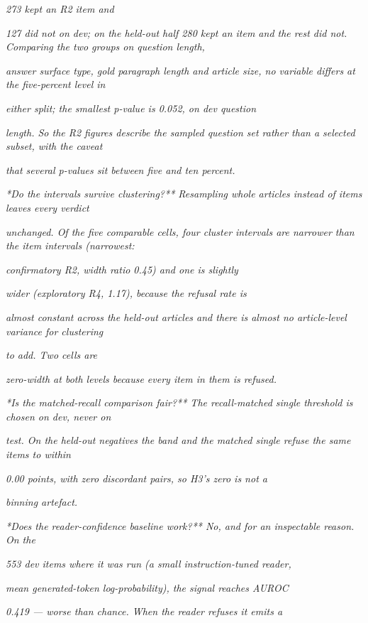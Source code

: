 \textit{273 kept an R2 item and}

\textit{127 did not on dev; on the held-out half 280 kept an item and the rest did not. Comparing the two groups on question length,}

\textit{answer surface type, gold paragraph length and article size, no variable differs at the five-percent level in}

\textit{either split; the smallest p-value is 0.052, on dev question}

\textit{length. So the R2 figures describe the sampled question set rather than a selected subset, with the caveat}

\textit{that several p-values sit between five and ten percent.}

\textit{*Do the intervals survive clustering?** Resampling whole articles instead of items leaves every verdict}

\textit{unchanged. Of the five comparable cells, four cluster intervals are narrower than the item intervals (narrowest:}

\textit{confirmatory R2, width ratio 0.45) and one is slightly}

\textit{wider (exploratory R4, 1.17), because the refusal rate is}

\textit{almost constant across the held-out articles and there is almost no article-level variance for clustering}

\textit{to add. Two cells are}

\textit{zero-width at both levels because every item in them is refused.}

\textit{*Is the matched-recall comparison fair?** The recall-matched single threshold is chosen on dev, never on}

\textit{test. On the held-out negatives the band and the matched single refuse the same items to within}

\textit{0.00 points, with zero discordant pairs, so H3's zero is not a}

\textit{binning artefact.}

\textit{*Does the reader-confidence baseline work?** No, and for an inspectable reason. On the}

\textit{553 dev items where it was run (a small instruction-tuned reader,}

\textit{mean generated-token log-probability), the signal reaches AUROC}

\textit{0.419 --- worse than chance. When the reader refuses it emits a}

